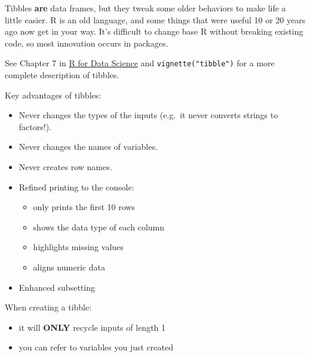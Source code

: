 \documentclass[]{book}
\providecommand{\tightlist}{%
  \setlength{\itemsep}{0pt}\setlength{\parskip}{0pt}}
\theoremstyle{definition}
\theoremstyle{definition}
\theoremstyle{definition}
\theoremstyle{remark}
\let\BeginKnitrBlock\begin \let\EndKnitrBlock\end
\begin{document}
Tibbles \textbf{are} data frames, but they tweak some older behaviors to
make life a little easier. R is an old language, and some things that
were useful 10 or 20 years ago now get in your way. It's difficult to
change base R without breaking existing code, so most innovation occurs
in packages.

\BeginKnitrBlock{rmdimportant}
See Chapter 7 in \href{http://r4ds.had.co.nz/tibbles.html}{R for Data
Science} and \texttt{vignette("tibble")} for a more complete description
of tibbles.
\EndKnitrBlock{rmdimportant}

Key advantages of tibbles:

\begin{itemize}
\tightlist
\item
  Never changes the types of the inputs (e.g.~it never converts strings
  to factors!).
\item
  Never changes the names of variables.
\item
  Never creates row names.
\item
  Refined printing to the console:

  \begin{itemize}
  \tightlist
  \item
    only prints the first 10 rows
  \item
    shows the data type of each column
  \item
    highlights missing values
  \item
    aligns numeric data
  \end{itemize}
\item
  Enhanced subsetting
\end{itemize}

When creating a tibble:

\begin{itemize}
\tightlist
\item
  it will \textbf{ONLY} recycle inputs of length 1
\item
  you can refer to variables you just created
\end{itemize}
\end{document}
